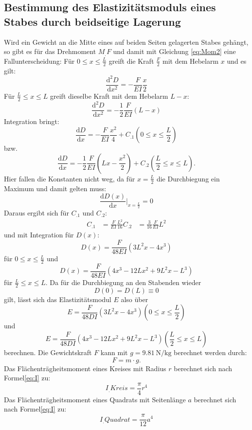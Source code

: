 \subsection{Bestimmung des Elastizitätsmoduls eines Stabes durch beidseitige Lagerung}

Wird ein Gewicht an die Mitte eines auf beiden Seiten gelagerten Stabes gehängt, so gibt es für das Drehmoment $M_.F$ und damit mit Gleichung \eqref{eq:Mom2} eine Fallunterscheidung:
Für $0 \leq x \leq \frac{L}{2}$ greift die Kraft $\frac{F}{2}$ mit dem Hebelarm $x$ und es gilt:
\[
\frac{\mathrm{d}^2D}{\mathrm{d}x^2} = -\frac{F}{E I}\frac{x}{2}
\]
Für $\frac{L}{2} \leq x \leq L$ greift dieselbe Kraft mit dem Hebelarm $L-x$:
\[
\frac{\mathrm{d}^2D}{\mathrm{d}x^2} = -\frac{1}{2}\frac{F}{E I} (L-x)
\]
Integration bringt:
\[
\frac{\mathrm{d}D}{\mathrm{d}x} = -\frac{F}{E I}\frac{x^2}{4} + C_.1  \left(0 \leq x \leq \frac{L}{2}\right)
\]
bzw.
\[
\frac{\mathrm{d}D}{\mathrm{d}x} = -\frac{1}{2}\frac{F}{E I}\left(L x - \frac{x^2}{2}\right) + C_.2  \left(\frac{L}{2} \leq x \leq L\right) \text{.}
\]
Hier fallen die Konstanten nicht weg, da für $x = \frac{L}{2}$ die Durchbiegung ein Maximum und damit gelten muss:
\[
\frac{\mathrm{d}D(x)}{\mathrm{d}x}|_{x = \frac{L}{2}} = 0
\]
Daraus ergibt sich für $C_.1$ und $C_.2$:
\begin{align*}
C_.1 &= \frac{F}{E I}\frac{L^2}{16}
C_.2 &= \frac{3}{16}\frac{F}{E I} L^2
\end{align*}
und mit Integration für $D(x)$:
\begin{equation*}
D(x) = \frac{F}{48 E I}\left(3 L^2 x - 4 x^3\right)
\end{equation*}
für $0 \leq x \leq \frac{L}{2}$ und
\begin{equation*}
D(x) = \frac{F}{48 E I}\left(4 x^3 - 12 L x^2 + 9 L^2 x - L^3\right)
\end{equation*}
für $\frac{L}{2} \leq x \leq L$.
Da für die Durchbiegung an den Stabenden wieder \[D(0)=D(L)\equiv 0 \] gilt, lässt sich das Elastizitätsmodul $E$ also über
\begin{equation}
E = \frac{F}{48 D I}\left(3 L^2 x - 4 x^3\right)   \left(0 \leq x \leq \frac{L}{2}\right) \label{eq:E2}
\end{equation}
und
\begin{equation}
E = \frac{F}{48 D I}\left(4 x^3 - 12 L x^2 + 9 L^2 x - L^3\right)  \left(\frac{L}{2} \leq x \leq L\right) \label{eq:E3}
\end{equation}
berechnen.
Die Gewichtskraft $F$ kann mit $g=\SI{9.81}{\newton\per\kilogram}$ \cite{g} berechnet werden durch:
\begin{equation}
	F = m \cdot g \text{.} \label{eq:F}
\end{equation}
Das Flächenträgheitsmoment eines Kreises mit Radius $r$ berechnet sich nach Formel\eqref{eq:I} zu:
\begin{equation}
	I_.{Kreis} = \frac{\pi}{4} r^4 \label{eq:I_Kreis}
\end{equation}
Das Flächenträgheitsmoment eines Quadrats mit Seitenlänge $a$ berechnet sich nach Formel\eqref{eq:I} zu:
\begin{equation}
	I_.{Quadrat} = \frac{\pi}{12} a^4 \label{eq:I_Quadrat}
\end{equation}